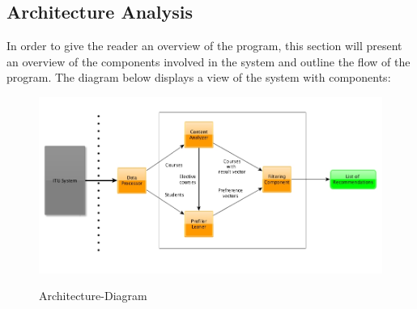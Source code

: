 

\subsection{Architecture Analysis}
In order to give the reader an overview of the program, this section will present an overview of the components involved in the system and outline the flow of the program. The diagram below displays a view of the system with components: 

\begin{figure}[H]
\centering
\includegraphics[scale=0.5]{Pictures/Architecture-Diagram.jpg}
\label{Architecture-Diagram}
\caption{Architecture-Diagram}
\end{figure}


